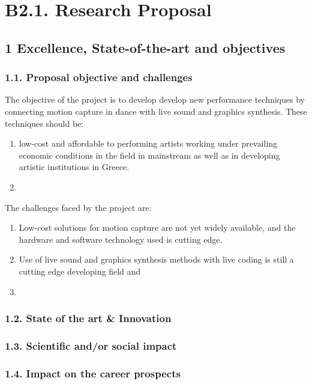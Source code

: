 \section{B2.1. Research Proposal}
\label{sec:org4b305c6}
\subsection{1 Excellence, State-of-the-art and objectives}
\label{sec:orgb01837e}
\subsubsection{1.1. Proposal objective and challenges}
\label{sec:orgffd2fe4}
The objective of the project is to develop develop new performance techniques by connecting motion capture in dance with live sound and graphics synthesis.  These techniques should be:

\begin{enumerate}
\item low-cost and affordable to performing artists working under prevailing economic conditions in the field in mainstream as well as in developing artistic institutions in Greece.
\item 
\end{enumerate}

The challenges faced by the project are: 

\begin{enumerate}
\item Low-cost solutions for motion capture are not yet widely available, and the hardware and software technology used is cutting edge.
\item Use of live sound and graphics synthesis methods with live coding is still a cutting edge developing field and
\item 
\end{enumerate}

\subsubsection{1.2. State of the art \& Innovation}
\label{sec:orgc950a82}


\subsubsection{1.3. Scientific and/or social impact}
\label{sec:orge7dbd7d}
\subsubsection{1.4. Impact on the career prospects}
\label{sec:org291db9d}

